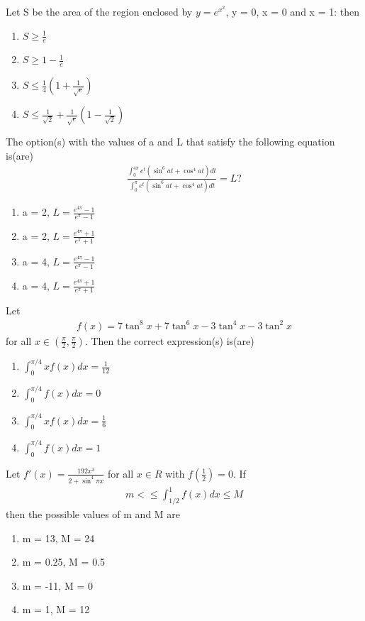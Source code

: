 \item Let S be the area of the region enclosed by $y = e^{x^{2}}$, y = 0, x = 0 and x = 1: then
\begin{enumerate}
\item $S \geq \frac{1}{e}$
\item $S \geq 1-\frac{1}{e}$
\item $S \leq \frac{1}{4}(1 + \frac{1}{\sqrt{e}})$
\item $S \leq \frac{1}{\sqrt{2}} + \frac{1}{\sqrt{e}}(1 - \frac{1}{\sqrt{2}})$
\end{enumerate}

\item The option(s) with the values of a and L that satisfy the following equation is(are)
\begin{align*}
\frac{\int_{0}^{4\pi}e^{t}(\sin^{6}at + \cos^{4}at)dt}{\int_{0}^{\pi}e^{t}(\sin^{6}at + \cos^{4}at)dt} = L?
\end{align*}
\begin{enumerate}
\item a = 2, $L = \frac{e^{4\pi} - 1}{e^{\pi} - 1}$
\item a = 2, $L = \frac{e^{4\pi} + 1}{e^{\pi} + 1}$
\item a = 4, $L = \frac{e^{4\pi} - 1}{e^{\pi} - 1}$
\item a = 4, $L = \frac{e^{4\pi} + 1}{e^{\pi} + 1}$
\end{enumerate}

\item Let 
\begin{align*}
f(x) = 7\tan^{8}x + 7\tan^{6}x - 3\tan^{4}x - 3\tan^{2}x
\end{align*}
for all $x \in (\frac{\pi}{2}, \frac{\pi}{2})$. Then the correct expression(s) is(are)
\begin{enumerate}
\item $\int_{0}^{\pi/4}xf(x)dx = \frac{1}{12}$
\item $\int_{0}^{\pi/4}f(x)dx = 0$
\item $\int_{0}^{\pi/4}xf(x)dx = \frac{1}{6}$
\item $\int_{0}^{\pi/4}f(x)dx = 1$
\end{enumerate}

\item Let $f'(x) = \frac{192x^{3}}{2 + \sin^{4}\pi x}$ for all $x \in R$ with $f(\frac{1}{2}) = 0$. If 
\begin{align*}
m < \leq \int_{1/2}^{1}f(x)dx \leq M
\end{align*}
then the possible values of m and M are
\begin{enumerate}
\item m = 13, M = 24
\item m = 0.25, M = 0.5
\item m = -11, M = 0
\item m = 1, M = 12
\end{enumerate}

